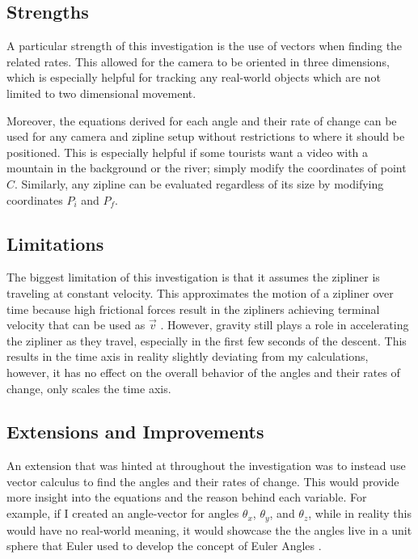 \documentclass[12pt]{article}
\begin{document}
\subsection{Strengths}

A particular strength of this investigation is the use of vectors when finding the related rates. This allowed for the camera to be oriented in three dimensions, which is especially helpful for tracking any real-world objects which are not limited to two dimensional movement. 

Moreover, the equations derived for each angle and their rate of change can be used for any camera and zipline setup without restrictions to where it should be positioned. This is especially helpful if some tourists want a video with a mountain in the background or the river; simply modify the coordinates of point $C$. Similarly, any zipline can be evaluated regardless of its size by modifying coordinates $P_i$ and $P_f$. 

\subsection{Limitations}
The biggest limitation of this investigation is that it assumes the zipliner is traveling at constant velocity. This approximates the motion of a zipliner over time because high frictional forces result in the zipliners achieving terminal velocity that can be used as $\vec v$ \autocite{terminal}. However, gravity still plays a role in accelerating the zipliner as they travel, especially in the first few seconds of the descent. This results in the time axis in reality slightly deviating from my calculations, however, it has no effect on the overall behavior of the angles and their rates of change, only scales the time axis. 


\subsection{Extensions and Improvements}
An extension that was hinted at throughout the investigation was to instead use vector calculus to find the angles and their rates of change. This would provide more insight into the equations and the reason behind each variable. For example, if I created an angle-vector for angles $\theta_x$, $\theta_y$, and $\theta_z$, while in reality this would have no real-world meaning, it would showcase the the angles live in a unit sphere that Euler used to develop the concept of Euler Angles \autocite{euler}. 
\end{document}
